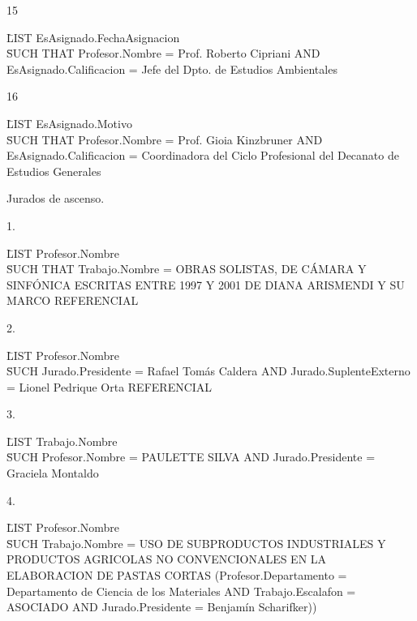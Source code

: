 15

\begin{tabbing}	
\= LIST EsAsignado.FechaAsignacion \\
\= SUCH THAT Profesor.Nombre = Prof. Roberto Cipriani AND \\
EsAsignado.Calificacion = Jefe del Dpto. de Estudios Ambientales
\end{tabbing}

16


\begin{tabbing}	
\= LIST EsAsignado.Motivo \\
\= SUCH THAT Profesor.Nombre = Prof. Gioia Kinzbruner AND \\
EsAsignado.Calificacion = Coordinadora del Ciclo Profesional del Decanato de Estudios Generales
\end{tabbing}



Jurados de ascenso.

1. 

\begin{tabbing}	
\= LIST Profesor.Nombre \\
\= SUCH THAT Trabajo.Nombre = OBRAS SOLISTAS, DE CÁMARA Y SINFÓNICA ESCRITAS ENTRE 1997 Y 2001 DE DIANA ARISMENDI Y SU MARCO REFERENCIAL \\
\end{tabbing}

2.

\begin{tabbing}	
\= LIST Profesor.Nombre \\
\= SUCH Jurado.Presidente = Rafael Tomás Caldera AND Jurado.SuplenteExterno = Lionel Pedrique Orta REFERENCIAL \\
\end{tabbing}

3. 

\begin{tabbing}	
\= LIST Trabajo.Nombre \\
\= SUCH Profesor.Nombre = PAULETTE SILVA AND Jurado.Presidente = Graciela Montaldo \\
\end{tabbing}

4.

\begin{tabbing}	
\= LIST Profesor.Nombre \\
\= SUCH Trabajo.Nombre = USO DE SUBPRODUCTOS INDUSTRIALES Y PRODUCTOS AGRICOLAS NO CONVENCIONALES EN LA ELABORACION DE PASTAS CORTAS 
(Profesor.Departamento = Departamento de Ciencia de los Materiales AND Trabajo.Escalafon = ASOCIADO AND 
 Jurado.Presidente = Benjamín Scharifker))
\end{tabbing}

